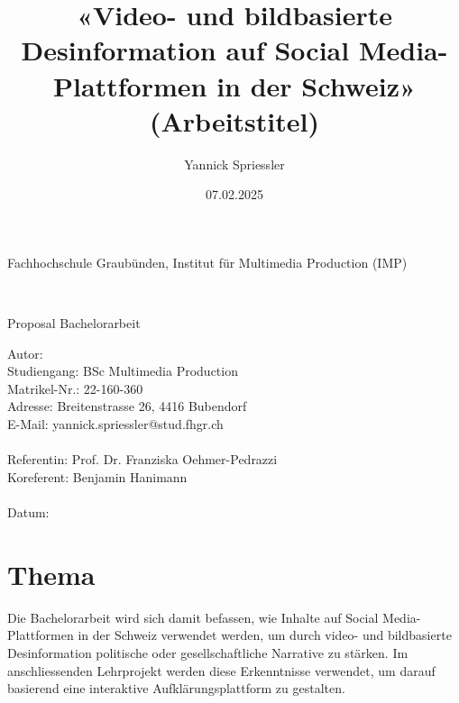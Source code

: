 \documentclass[12pt,a4paper]{article}        %
\title{«Video- und bildbasierte Desinformation auf Social Media-Plattformen in der Schweiz» (Arbeitstitel)}        %
\author{Yannick Spriessler}     %
\date{07.02.2025}     %
\begin{document}
\begin{titlingpage} %
  \begin{center}
    \begin{large}
      Fachhochschule Graubünden, Institut für Multimedia Production (IMP)\\ %
    \end{large}
    \vspace{2cm} %
    \begin{LARGE}
      \textbf{\thetitle} \\
    \end{LARGE}
    \vspace{1cm}
    \begin{large}
      Proposal Bachelorarbeit\\
    \end{large}
    \vspace{5cm} %
    Autor: \theauthor \\
    Studiengang: BSc Multimedia Production \\
    Matrikel-Nr.: 22-160-360 \\
    Adresse: Breitenstrasse 26, 4416 Bubendorf \\
    E-Mail: yannick.spriessler@stud.fhgr.ch \\ \\
    Referentin: Prof. Dr. Franziska Oehmer-Pedrazzi \\
    Koreferent: Benjamin Hanimann \\ \\
    Datum: \thedate
  \end{center}
\end{titlingpage}
\thispagestyle{empty}
\setcounter{page}{0}    %
\tableofcontents        %
\pagebreak

\section{Thema}
Die Bachelorarbeit wird sich damit befassen, wie Inhalte auf Social Media-Plattformen in der Schweiz verwendet werden, um durch video- und bildbasierte Desinformation politische oder gesellschaftliche Narrative zu stärken. Im anschliessenden Lehrprojekt werden diese Erkenntnisse verwendet, um darauf basierend eine interaktive Aufklärungsplattform zu gestalten.
\end{document}
